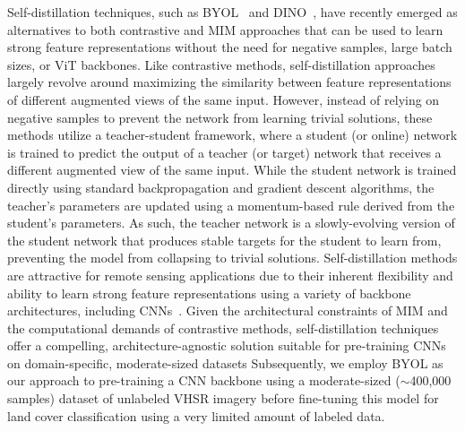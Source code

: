 Self-distillation techniques, such as BYOL~\citep{grillBootstrapYourOwn2020} and DINO~\citep{caronEmergingPropertiesSelfSupervised2021}, have recently emerged as alternatives to both contrastive and MIM approaches that can be used to learn strong feature representations without the need for negative samples, large batch sizes, or ViT backbones.
Like contrastive methods, self-distillation approaches largely revolve around maximizing the similarity between feature representations of different augmented views of the same input.
However, instead of relying on negative samples to prevent the network from learning trivial solutions, these methods utilize a teacher-student framework, where a student (or online) network is trained to predict the output of a teacher (or target) network that receives a different augmented view of the same input.
While the student network is trained directly using standard backpropagation and gradient descent algorithms, the teacher's parameters are updated using a momentum-based rule derived from the student's parameters.
As such, the teacher network is a slowly-evolving version of the student network that produces stable targets for the student to learn from, preventing the model from collapsing to trivial solutions.
Self-distillation methods are attractive for remote sensing applications due to their inherent flexibility and ability to learn strong feature representations using a variety of backbone architectures, including CNNs~\citep{chenExploringSimpleSiamese2020}.
Given the architectural constraints of MIM and the computational demands of contrastive methods, self-distillation techniques offer a compelling, architecture-agnostic solution suitable for pre-training CNNs on domain-specific, moderate-sized datasets
Subsequently, we employ BYOL as our approach to pre-training a CNN backbone using a moderate-sized (\(\sim\)400,000 samples) dataset of unlabeled VHSR imagery before fine-tuning this model for land cover classification using a very limited amount of labeled data.



